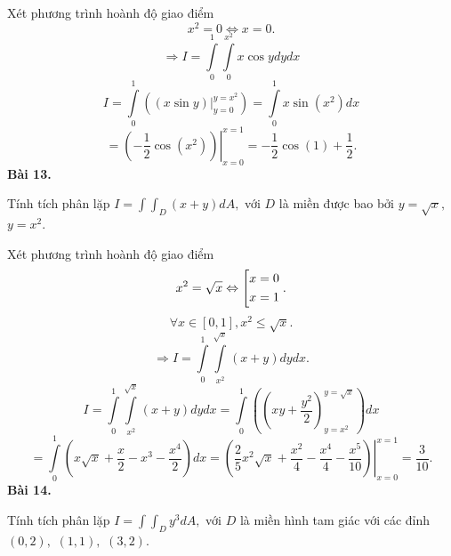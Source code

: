 \documentclass[12pt,a4paper]{article}
\begin{document}
Xét phương trình hoành độ giao điểm
\[{x^2} = 0 \Leftrightarrow x = 0.\]
\[ \Rightarrow I = \int\limits_0^1 {\int\limits_0^{{x^2}} {x\cos ydydx} } \]
\[I = \int\limits_0^1 {\left( {\left. {\left( {x\sin y} \right)} \right|_{y = 0}^{y = {x^2}}} \right)}  = \int\limits_0^1 {x\sin \left( {{x^2}} \right)} dx\]
\[ = \left. {\left( { - \frac{1}{2}\cos \left( {{x^2}} \right)} \right)} \right|_{x = 0}^{x = 1} =  - \frac{1}{2}\cos \left( 1 \right) + \frac{1}{2}.\]
\textbf{Bài 13.}
\begin{mybox}
Tính tích phân lặp \(I = \int {\int_D {\left( {x + y} \right)dA} } ,\) với \(D\) là miền được bao bởi \(y = \sqrt x ,\) \(y = {x^2}.\)
\end{mybox}
Xét phương trình hoành độ giao điểm
\[{x^2} = \sqrt x  \Leftrightarrow \left[ \begin{gathered}
  x = 0 \hfill \\
  x = 1 \hfill \\ 
\end{gathered}  \right..\]
\[\forall x \in \left[ {0,1} \right],{x^2} \leqslant \sqrt x .\]
\[ \Rightarrow I = \int\limits_0^1 {\int\limits_{{x^2}}^{\sqrt x } {\left( {x + y} \right)dy} dx} .\]
\[I = \int\limits_0^1 {\int\limits_{{x^2}}^{\sqrt x } {\left( {x + y} \right)dy} dx}  = \int\limits_0^1 {\left( {\left( {xy + \frac{{{y^2}}}{2}} \right)_{y = {x^2}}^{y = \sqrt x }} \right)} dx\]
\[ = \int\limits_0^1 {\left( {x\sqrt x  + \frac{x}{2} - {x^3} - \frac{{{x^4}}}{2}} \right)} dx = \left. {\left( {\frac{2}{5}{x^2}\sqrt x  + \frac{{{x^2}}}{4} - \frac{{{x^4}}}{4} - \frac{{{x^5}}}{{10}}} \right)} \right|_{x = 0}^{x = 1} = \frac{3}{{10}}.\]
\textbf{Bài 14.}
\begin{mybox}
Tính tích phân lặp \(I = \int {\int_D {{y^3}} dA}, \) với \(D\) là miền hình tam giác với các đỉnh \(\left( {0,2} \right),\) \(\left( {1,1} \right),\) \(\left( {3,2} \right).\)
\end{mybox}
\end{document}
